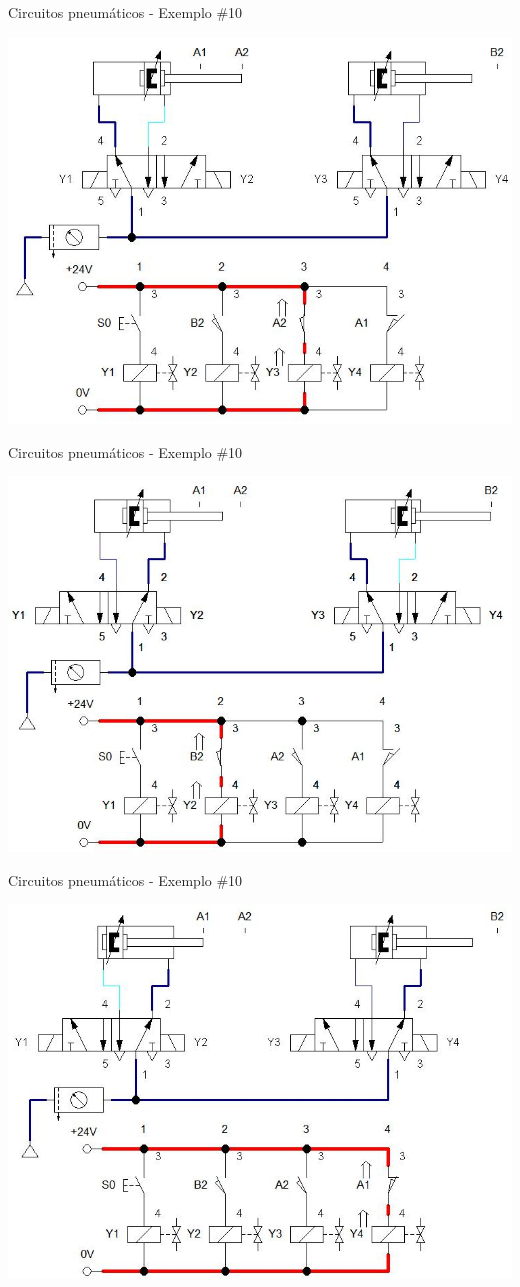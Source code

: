 \begin{frame}{Circuitos pneumáticos - Exemplo \#10}
	
	\centering
	\includegraphics[width=0.8\linewidth]{Figuras/Ch14/fig52n3}
	
\end{frame}


\begin{frame}{Circuitos pneumáticos - Exemplo \#10}
	
	\centering
	\includegraphics[width=0.8\linewidth]{Figuras/Ch14/fig52n4}
	
\end{frame}


\begin{frame}{Circuitos pneumáticos - Exemplo \#10}
	
	\centering
	\includegraphics[width=0.8\linewidth]{Figuras/Ch14/fig52n5}
	
\end{frame}


